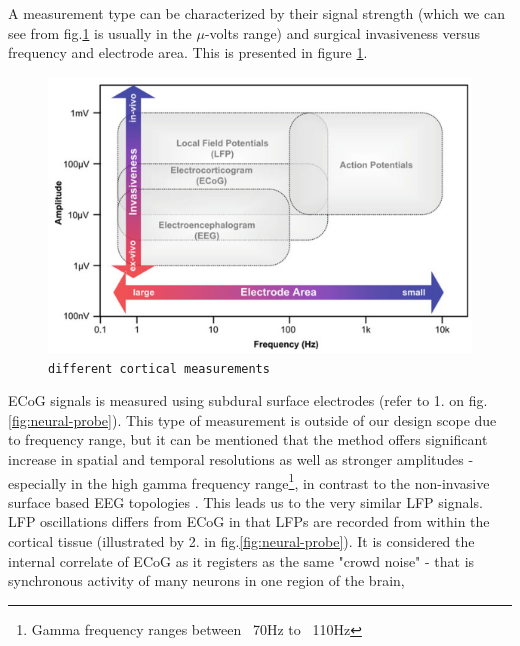    A measurement type can be characterized by their signal strength (which we can see from fig.\ref{fig:cortical-measurements} is usually in the $\mu$-volts range) and surgical invasiveness 
    versus frequency and electrode area. This is presented in figure \ref{fig:cortical-measurements}.   
      \begin{figure}
	\centering
	\includegraphics[scale=.75]{images/Amp-vs-freq-common-biopotential-signals2.png}
	\caption{\texttt{\footnotesize{different cortical measurements \cite{yoo2011biomedical-cmos}}}}
	\label{fig:cortical-measurements}
      \end{figure}
    \acs{ECoG} signals is measured using subdural surface electrodes (refer to 1. on fig.\ref{fig:neural-probe}). This type of measurement is outside of our design scope due to frequency range,
    but it can be mentioned that the method offers significant increase in spatial and temporal resolutions as well as stronger amplitudes - especially in 
    the high gamma frequency range\footnote{Gamma frequency ranges between ~70Hz to ~110Hz\cite{hill2012recording}}, 
    in contrast to the non-invasive surface based \acs{EEG} topologies \cite{hill2012recording}. This leads us to the very similar \acs{LFP} signals.
    \acs{LFP} oscillations differs from \acs{ECoG} in that LFPs are recorded from within the cortical tissue (illustrated by 2. in fig.\ref{fig:neural-probe}). 
    It is considered the internal correlate of \acs{ECoG} as it registers as the same "crowd noise" - that is synchronous activity of many neurons in one region of the brain,
